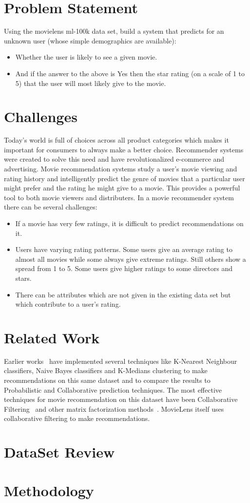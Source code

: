 \documentclass[pdftex,12pt,a4paper]{article}
\begin{document}
	
	
	\tableofcontents
	\newpage
	
	\section{Problem Statement}
		Using the movielens ml-100k data set, build a system that predicts for an unknown user (whose simple demographics are
available):
		\begin{itemize}
			\item Whether the user is likely to see a given movie.
			\item And if the answer to the above is Yes then the star rating (on a scale of 1 to 5) that the user will most likely give to the movie.
		\end{itemize}
	
	\section{Challenges}
		Today's world is full of choices across all product categories which makes it important for consumers to always make a better choice. Recommender systems were created to solve this need and have revolutionalized e-commerce and advertising. Movie recommendation systems study a user's movie viewing and rating history and intelligently predict the genre of movies that a particular user might prefer and the rating he might give to a movie. This provides a powerful tool to both movie viewers and distributers. In a movie recommender system there can be several challenges:
		\begin{itemize}
			\item If a movie has very few ratings, it is difficult to predict recommendations on it.
			\item Users have varying rating patterns. Some users give an average rating to almost all movies while some always give extreme ratings. Still others show a spread from 1 to 5. Some users give higher ratings to some directors and stars.
			\item There can be attributes which are not given in the existing data set but which contribute to a user's rating.
		\end{itemize}
	
	\section{Related Work}
		Earlier works~\cite{Schein2002,MarlinThesis2004} have implemented several techniques like K-Nearest Neighbour classifiers, Naive Bayes classifiers and K-Medians clustering to make recommendations on this same dataset and to compare the results to Probabilistic and Collaborative prediction techniques. The most effective techniques for movie recommendation on this dataset have been Collaborative Filtering~\cite{Sarwar2001,Agarwal2009} and other matrix factorization methods~\cite{CoTriFactor2009}. MovieLens itself uses collaborative filtering to make recommendations.
	
	\section{DataSet Review}
	
	\section{Methodology}

	
	
\end{document}
